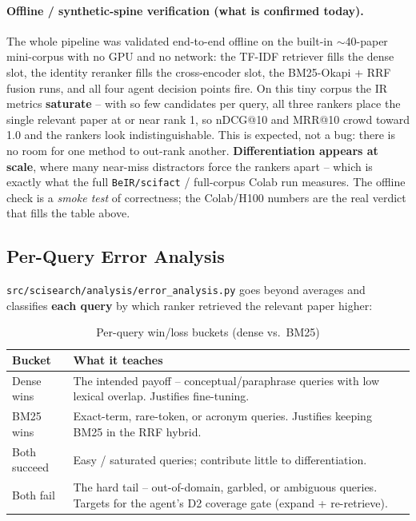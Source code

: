 \documentclass[12pt,a4paper]{article}
\begin{document}
\paragraph{Offline / synthetic-spine verification (what is confirmed today).} The whole pipeline was validated end-to-end offline on the built-in $\sim$40-paper mini-corpus with no GPU and no network: the TF-IDF retriever fills the dense slot, the identity reranker fills the cross-encoder slot, the BM25-Okapi + RRF fusion runs, and all four agent decision points fire. On this tiny corpus the IR metrics \textbf{saturate} -- with so few candidates per query, all three rankers place the single relevant paper at or near rank 1, so nDCG@10 and MRR@10 crowd toward 1.0 and the rankers look indistinguishable. This is expected, not a bug: there is no room for one method to out-rank another. \textbf{Differentiation appears at scale}, where many near-miss distractors force the rankers apart -- which is exactly what the full \texttt{BeIR/scifact} / full-corpus Colab run measures. The offline check is a \emph{smoke test} of correctness; the Colab/H100 numbers are the real verdict that fills the table above.

\subsection{Per-Query Error Analysis}

\texttt{src/scisearch/analysis/error\_analysis.py} goes beyond averages and classifies \textbf{each query} by which ranker retrieved the relevant paper higher:

\begin{table}[H]
\centering
\caption{Per-query win/loss buckets (dense vs.\ BM25)}
\small
\begin{tabularx}{\linewidth}{@{} l L @{}}
\toprule
\textbf{Bucket} & \textbf{What it teaches} \\
\midrule
Dense wins & The intended payoff -- conceptual/paraphrase queries with low lexical overlap. Justifies fine-tuning. \\
BM25 wins & Exact-term, rare-token, or acronym queries. Justifies keeping BM25 in the RRF hybrid. \\
Both succeed & Easy / saturated queries; contribute little to differentiation. \\
Both fail & The hard tail -- out-of-domain, garbled, or ambiguous queries. Targets for the agent's D2 coverage gate (expand + re-retrieve). \\
\bottomrule
\end{tabularx}
\end{table}
\end{document}
